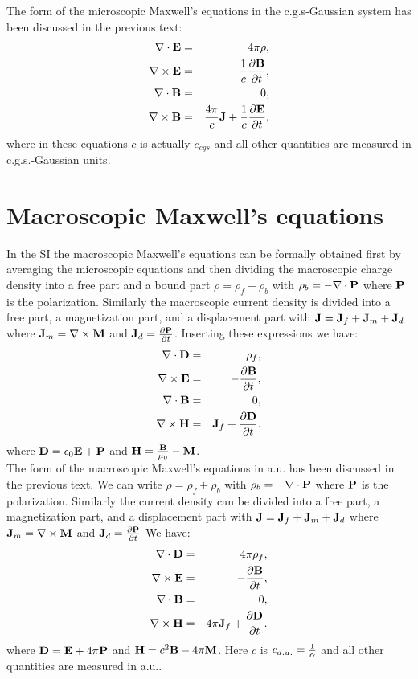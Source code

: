 \documentclass[12pt,a4paper]{article}
\begin{document}
{\color{orange} The form of the microscopic Maxwell's equations
in the c.g.s-Gaussian system has been discussed in the previous text:
\begin{eqnarray}
\nabla \cdot {\bf E} &=& 4 \pi \rho, \\
\nabla \times {\bf E} &=& -{1\over c} {\partial {\bf B} \over \partial t}, \\
\nabla \cdot {\bf B} &=& 0, \\
\nabla \times {\bf B} &=& {4 \pi \over c} {\bf J}+ {1\over c}
{\partial {\bf E} \over \partial t}, 
\end{eqnarray}
where in these equations $c$ is actually $c_{cgs}$ and all 
other quantities are measured in c.g.s.-Gaussian units.
}

\newpage
\section{\color{coral}Macroscopic Maxwell's equations}
In the SI the macroscopic Maxwell's equations can be formally obtained 
first by averaging the microscopic equations and then dividing the 
macroscopic charge density into a free part and a
bound part $\rho=\rho_f+\rho_b$ with $\rho_b=-\nabla \cdot {\bf P}$
where ${\bf P}$ is the polarization.
Similarly the macroscopic current density is divided into a free part, a 
magnetization part, 
and a displacement part with ${\bf J}={\bf J}_f + {\bf J}_m + {\bf J}_d$ where
${\bf J}_m=\nabla \times {\bf M}$ and ${\bf J}_d={\partial {\bf P}\over 
\partial t}$.
Inserting these expressions we have:
\begin{eqnarray}
\nabla \cdot {\bf D} &=& \rho_f, \\
\nabla \times {\bf E} &=& -{\partial {\bf B} \over \partial t}, \\
\nabla \cdot {\bf B} &=& 0, \\
\nabla \times {\bf H} &=& {\bf J}_f+ {\partial {\bf D} \over \partial t}. 
\end{eqnarray}
where ${\bf D}=\epsilon_0 {\bf E}+{\bf P}$ and ${\bf H}={{\bf B}\over \mu_0}-
{\bf M}$.
\\

{\color{web-blue} The form of the macroscopic Maxwell's equations
in a.u. has been discussed in the previous text.
We can write $\rho=\rho_f+\rho_b$ with $\rho_b=-\nabla \cdot {\bf P}$
where ${\bf P}$ is the polarization.
Similarly the current density can be divided into a free part, a magnetization
part,
and a displacement part with ${\bf J}={\bf J}_f + {\bf J}_m + {\bf J}_d$ where
${\bf J}_m=\nabla \times {\bf M}$ and ${\bf J}_d={\partial {\bf P}\over 
\partial t}$
We have:
\begin{eqnarray}
\nabla \cdot {\bf D} &=& 4 \pi \rho_f, \\
\nabla \times {\bf E} &=& -{\partial {\bf B} \over \partial t}, \\
\nabla \cdot {\bf B} &=& 0, \\
\nabla \times {\bf H} &=& 4 \pi {\bf J}_f+ {\partial {\bf D} \over 
\partial t}. 
\end{eqnarray}
where ${\bf D}={\bf E} + 4 \pi {\bf P}$ and ${\bf H}={c^2
{\bf B}}- 4 \pi {\bf M}$.
Here $c$ is $c_{a.u.}={1\over \alpha}$ and all other quantities are 
measured in a.u..
}
\\
\end{document}
